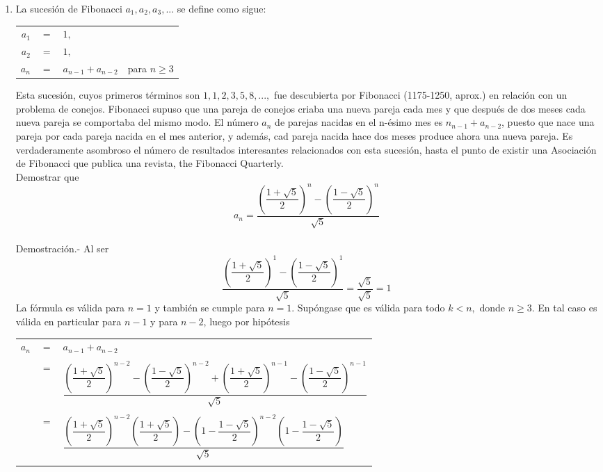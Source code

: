\begin{enumerate}
\begin{enumerate}[\bfseries a)]
	\item La sucesión de Fibonacci $a_1,a_2,a_3,...$ se define como sigue:
      \begin{center}
	 \begin{tabular}{rcll}
	    $a_1$ & $=$ & $1,$ & \\
	    $a_2$ & $=$ & $1,$ & \\
	    $a_n$ & $=$ & $a_{n-1} + a_{n-2}$ & para $n \geq 3$\\
	 \end{tabular}
      \end{center}
      Esta sucesión, cuyos primeros términos son $1,1,2,3,5,8,...,$ fue descubierta por Fibonacci (1175-1250, aprox.) en relación con un problema de conejos. Fibonacci supuso que una pareja de conejos criaba una nueva pareja cada mes y que después de dos meses cada nueva pareja se comportaba del mismo modo. El número $a_n$ de parejas nacidas en el n-ésimo mes es $n_{n-1} + a_{n-2}$, puesto que nace una pareja por cada pareja nacida en el mes anterior, y además, cad pareja nacida hace dos meses produce ahora una nueva pareja. Es verdaderamente asombroso el número de resultados interesantes relacionados con esta sucesión, hasta el punto de existir una Asociación de Fibonacci que publica una revista, the Fibonacci Quarterly.\\
      Demostrar que $$a_n = \dfrac{\left( \dfrac{1+\sqrt{5}}{2} \right)^n - \left( \dfrac{1-\sqrt{5}}{2} \right)^n}{\sqrt{5}}$$\\
      Demostración.- \; Al ser $$\dfrac{\left( \dfrac{1+\sqrt{5}}{2} \right)^1 - \left( \dfrac{1-\sqrt{5}}{2} \right)^1}{\sqrt{5}}=\dfrac{\sqrt{5}}{\sqrt{5}}=1$$
      La fórmula es válida para $n=1$ y también se cumple para $n=1$. Supóngase que es válida para todo $k<n,$ donde $n\geq 3.$ En tal caso es válida en particular para $n-1$ y para $n-2$, luego por hipótesis
      \begin{center}
	 \begin{tabular}{rcl}
	    $a_n$ & $=$ & $a_{n-1} + a_{n-2}$\\\\
		  & $=$ & $\dfrac{\left( \dfrac{1+\sqrt{5}}{2} \right)^{n-2} - \left( \dfrac{1-\sqrt{5}}{2} \right)^{n-2} + \left( \dfrac{1+\sqrt{5}}{2} \right)^{n-1} - \left( \dfrac{1-\sqrt{5}}{2} \right)^{n-1}}{\sqrt{5}}$\\\\
		  & $=$ & $\dfrac{\left( \dfrac{1+\sqrt{5}}{2}\right)^{n-2} \left( \dfrac{1+\sqrt{5}}{2} \right) - \left( 1 - \dfrac{1-\sqrt{5}}{2} \right)^{n-2} \left( 1 - \dfrac{1- \sqrt{5}}{2} \right)}{\sqrt{5}}$\\\\

\end{tabular}
\end{center}
\end{enumerate}
\end{enumerate}
